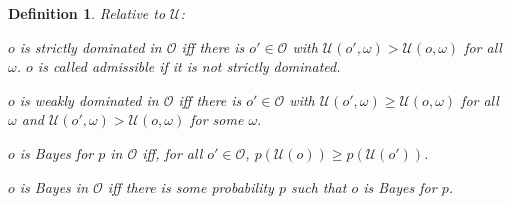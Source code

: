 \documentclass[a4paper,final]{article}
\newtheorem{definition}[theorem]{Definition}
\newcommand\Exp{\mathsf{Exp}}
\renewcommand\O{\mathcal{O}}
\newcommand\Uwald{\mathcal{U}} %
\renewcommand{\Re}{\mathbb{R}}
\newcommand\SetDelimiter[1][]{
	\nonscript\,#1\vert \allowbreak \nonscript\,\mathopen{}}
\providecommand\given{\SetDelimiter}
\renewcommand{\geq}{\geqslant}
\newenvironment{CCM rewritten}
{\begingroup\color{blue}} %
{\endgroup}              %
\begin{document}
















%






\begin{definition}
Relative to $\Uwald$:

	$o$ is \emph{strictly dominated in $\O$} iff there is $o'\in\O$ with $\Uwald(o',\omega)>\Uwald(o,\omega)$ for all $\omega$. $o$ is called \emph{admissible} if it is not strictly dominated. 
	
	$o$ is \emph{weakly dominated in $\O$} iff there is $o'\in\O$ with $\Uwald(o',\omega)\geq\Uwald(o,\omega)$ for all $\omega$ and $\Uwald(o',\omega)>\Uwald(o,\omega)$ for some $\omega$.
	
	$o$ is \emph{Bayes for $p$ in $\O$}  iff, for all $o'\in\O$, $p(\Uwald(o))\geq p(\Uwald(o'))$. 
	
	$o$ is \emph{Bayes in $\O$} iff there is some probability $p$ such that $o$ is Bayes for $p$. %
\end{definition}
\end{document}
